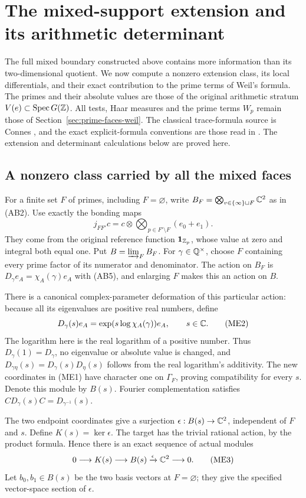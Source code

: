 \section{The mixed-support extension and its arithmetic determinant}
\label{sec:mixed-extension-trace}
The full mixed boundary constructed above contains more information than its
two-dimensional quotient. We now compute a nonzero extension class, its local
differentials, and their exact contribution to the prime terms of Weil's
formula. The primes and their absolute values are those of the original
arithmetic stratum $V(e)\subset\operatorname{Spec} G(\mathbb Z)$. All tests, Haar measures and
the prime terms $W_p$ remain those of Section~\ref{sec:prime-faces-weil}.
The classical trace-formula source is Connes
\cite[Section III and Section V]{Connes1998}, and the exact explicit-formula
conventions are those read in \cite[\texttt{wp}, \texttt{arch}]{Connes2026}.
The extension and determinant calculations below are proved here.

\subsection{A nonzero class carried by all the mixed faces}
For a finite set $F$ of primes, including $F=\varnothing$, write
$B_F=\bigotimes_{v\in\{\infty\}\sqcup F}\mathbb C^2$ as in (AB2).
Use exactly the bonding maps
\[
 j_{FF'}c=c\otimes\bigotimes_{p\in F'\setminus F}(e_0+e_1).
 \tag{ME1}
\]
They come from the original reference function $\mathbf1_{\mathbb Z_p}$,
whose value at zero and integral both equal one. Put
$B=\varinjlim_F B_F$. For $\gamma\in\mathbb Q^\times$, choose $F$ containing
every prime factor of its numerator and denominator. The action on $B_F$ is
$D_\gamma e_A=\chi_A(\gamma)e_A$ with (AB5), and enlarging $F$ makes
this an action on $B$.

There is a canonical complex-parameter deformation of this particular
action: because all its eigenvalues are positive real numbers, define
\[
 D_\gamma(s)e_A=\exp(s\log\chi_A(\gamma))e_A,
 \qquad s\in\mathbb C.
 \tag{ME2}
\]
The logarithm here is the real logarithm of a positive number. Thus
$D_\gamma(1)=D_\gamma$, no eigenvalue or absolute value is changed, and
$D_{\gamma\eta}(s)=D_\gamma(s)D_\eta(s)$ follows from the real logarithm's
additivity. The new coordinates in (ME1) have character one on
$\Gamma_F$, proving compatibility for every $s$. Denote this module by
$B(s)$. Fourier complementation satisfies
$CD_\gamma(s)C=D_{\gamma^{-1}}(s)$.

The two endpoint coordinates give a surjection
$\epsilon:B(s)\to\mathbb C^2$, independent of $F$ and $s$. Define
$K(s)=\ker\epsilon$. The target has the trivial rational action, by the
product formula. Hence there is an exact sequence of actual modules
\[
 0\longrightarrow K(s)\longrightarrow B(s)
 \xrightarrow{\epsilon}\mathbb C^2\longrightarrow0.
 \tag{ME3}\label{eq:ME-extension}
\]
Let $b_0,b_1\in B(s)$ be the two basis vectors at $F=\varnothing$;
they give the specified vector-space section of $\epsilon$.

